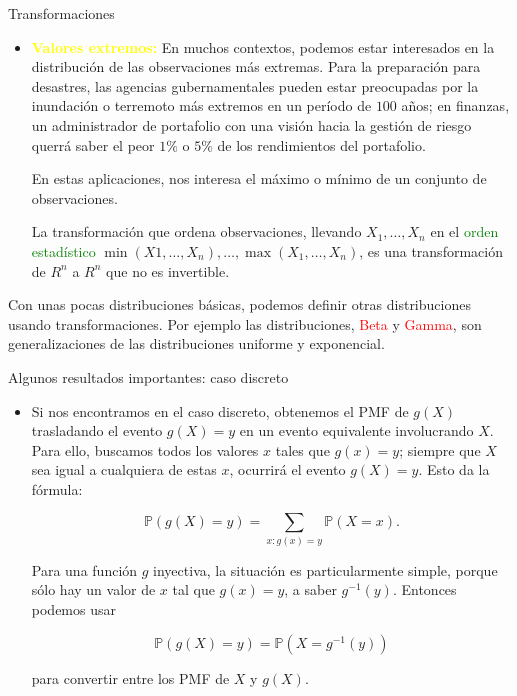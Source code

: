 \documentclass[10pt]{beamer}
\begin{document}
\begin{frame}{Transformaciones}
\small{
\begin{itemize}
\item \textcolor{yellow}{\textbf{Valores extremos:}} En muchos contextos, podemos estar interesados en la distribuci\'on de las observaciones m\'as extremas. Para la preparaci\'on para desastres, las agencias gubernamentales pueden estar preocupadas por la inundaci\'on o terremoto m\'as extremos en un per\'iodo de $100$ a\~nos; en finanzas, un administrador de portafolio con una visi\'on  hacia la gesti\'on de riesgo querr\'a saber el peor $1\%$ o $5\%$ de los rendimientos del portafolio.

\vspace{0.2cm}

En estas aplicaciones, nos interesa el m\'aximo o m\'inimo de un conjunto de observaciones.

\vspace{0.2cm}
	
La transformaci\'on que ordena observaciones, llevando $X_1,\dots, X_n$ en el \textcolor{green}{orden estad\'istico}  $\min(X 1,\dots, X_n),\dots , \max(X_1,\dots, X_n)$, es una transformaci\'on de $R^n$ a $R^n$ que no es invertible.
\end{itemize}

\vspace{0.2cm}

Con unas pocas distribuciones b\'asicas, podemos definir otras distribuciones usando transformaciones.  Por ejemplo las distribuciones, \textcolor{red}{Beta} y \textcolor{red}{Gamma}, son generalizaciones de las distribuciones   uniforme y exponencial.
}

\end{frame}
\begin{frame}{Algunos resultados importantes: caso discreto}
\small{
\begin{itemize}
\item Si nos encontramos en el caso discreto, obtenemos el PMF de $g(X)$ trasladando el evento $g(X) = y$ en un evento equivalente involucrando $X$. Para ello, buscamos todos los valores $x$ tales que $g(x) = y$; siempre que $X$ sea igual a cualquiera de estas $x$, ocurrir\'a el evento $g(X) = y$. Esto da la f\'ormula:

\[
\mathbb{P}(g(X) = y) = \sum_{x: g(x) = y}\mathbb{P}(X = x).
\]

Para una funci\'on  $g$ inyectiva, la situaci\'on es particularmente simple, porque s\'olo hay un valor de $x$ tal que $g(x) = y$, a saber $g^{-1}(y)$. Entonces podemos usar

\[
\mathbb{P}(g(X) = y) = \mathbb{P}(X = g^{-1}(y))
\]

\vspace{0.2cm}

para convertir entre los PMF de $X$ y $g(X)$.
\end{itemize}
		
}

\end{frame}
\end{document}
